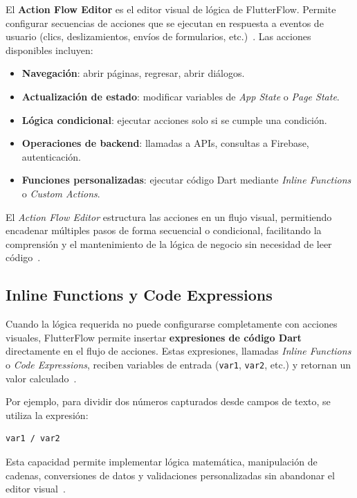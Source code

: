 \documentclass[12pt,a4paper]{article}
\begin{document}
El \textbf{Action Flow Editor} es el editor visual de lógica de FlutterFlow. Permite configurar secuencias de acciones que se ejecutan en respuesta a eventos de usuario (clics, deslizamientos, envíos de formularios, etc.)~\cite{flutterflow2024}. Las acciones disponibles incluyen:

\begin{itemize}
  \item \textbf{Navegación}: abrir páginas, regresar, abrir diálogos.
  \item \textbf{Actualización de estado}: modificar variables de \textit{App State} o \textit{Page State}.
  \item \textbf{Lógica condicional}: ejecutar acciones solo si se cumple una condición.
  \item \textbf{Operaciones de backend}: llamadas a APIs, consultas a Firebase, autenticación.
  \item \textbf{Funciones personalizadas}: ejecutar código Dart mediante \textit{Inline Functions} o \textit{Custom Actions}.
\end{itemize}

El \textit{Action Flow Editor} estructura las acciones en un flujo visual, permitiendo encadenar múltiples pasos de forma secuencial o condicional, facilitando la comprensión y el mantenimiento de la lógica de negocio sin necesidad de leer código~\cite{flutterflow2024}.

\subsection{Inline Functions y Code Expressions}

Cuando la lógica requerida no puede configurarse completamente con acciones visuales, FlutterFlow permite insertar \textbf{expresiones de código Dart} directamente en el flujo de acciones. Estas expresiones, llamadas \textit{Inline Functions} o \textit{Code Expressions}, reciben variables de entrada (\texttt{var1}, \texttt{var2}, etc.) y retornan un valor calculado~\cite{flutterflow2024}.

Por ejemplo, para dividir dos números capturados desde campos de texto, se utiliza la expresión:

\begin{lstlisting}[caption={Expresión Dart para división en FlutterFlow}]
var1 / var2
\end{lstlisting}

Esta capacidad permite implementar lógica matemática, manipulación de cadenas, conversiones de datos y validaciones personalizadas sin abandonar el editor visual~\cite{flutterflow2024}.
\end{document}
